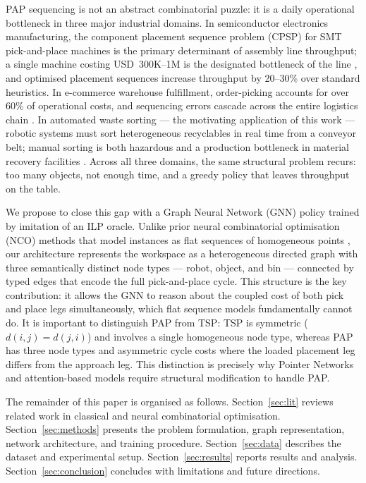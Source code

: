 \documentclass[conference]{IEEEtran}
\begin{document}
PAP sequencing is not an abstract combinatorial puzzle: it is a daily operational bottleneck in three major industrial domains. In semiconductor electronics manufacturing, the component placement sequence problem (CPSP) for SMT pick-and-place machines is the primary determinant of assembly line throughput; a single machine costing USD~300K--1M is the designated bottleneck of the line \cite{AYOB2008893}, and optimised placement sequences increase throughput by 20--30\% over standard heuristics. In e-commerce warehouse fulfillment, order-picking accounts for over 60\% of operational costs, and sequencing errors cascade across the entire logistics chain \cite{cheng2024drl}. In automated waste sorting --- the motivating application of this work --- robotic systems must sort heterogeneous recyclables in real time from a conveyor belt; manual sorting is both hazardous and a production bottleneck in material recovery facilities \cite{gundupalli2020sequence}. Across all three domains, the same structural problem recurs: too many objects, not enough time, and a greedy policy that leaves throughput on the table.

We propose to close this gap with a Graph Neural Network (GNN) policy trained by imitation of an ILP oracle. Unlike prior neural combinatorial optimisation (NCO) methods that model instances as flat sequences of homogeneous points \cite{vinyals2015pointer, kool2019attention}, our architecture represents the workspace as a heterogeneous directed graph with three semantically distinct node types --- robot, object, and bin --- connected by typed edges that encode the full pick-and-place cycle. This structure is the key contribution: it allows the GNN to reason about the coupled cost of both pick and place legs simultaneously, which flat sequence models fundamentally cannot do. It is important to distinguish PAP from TSP: TSP is symmetric ($d(i,j)=d(j,i)$) and involves a single homogeneous node type, whereas PAP has three node types and asymmetric cycle costs where the loaded placement leg differs from the approach leg. This distinction is precisely why Pointer Networks \cite{vinyals2015pointer} and attention-based models \cite{kool2019attention} require structural modification to handle PAP.

The remainder of this paper is organised as follows. Section~\ref{sec:lit} reviews related work in classical and neural combinatorial optimisation. Section~\ref{sec:methods} presents the problem formulation, graph representation, network architecture, and training procedure. Section~\ref{sec:data} describes the dataset and experimental setup. Section~\ref{sec:results} reports results and analysis. Section~\ref{sec:conclusion} concludes with limitations and future directions.
\end{document}
